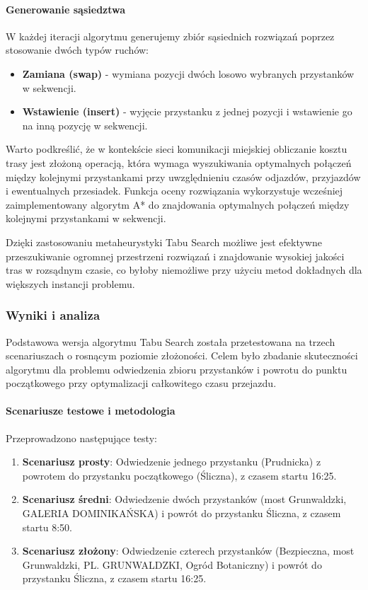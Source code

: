 \documentclass[12pt,a4paper]{article}
\begin{document}
\paragraph{Generowanie sąsiedztwa}
W każdej iteracji algorytmu generujemy zbiór sąsiednich rozwiązań poprzez stosowanie dwóch typów ruchów:
\begin{itemize}
    \item \textbf{Zamiana (swap)} - wymiana pozycji dwóch losowo wybranych przystanków w sekwencji.
    \item \textbf{Wstawienie (insert)} - wyjęcie przystanku z jednej pozycji i wstawienie go na inną pozycję w sekwencji.
\end{itemize}

Warto podkreślić, że w kontekście sieci komunikacji miejskiej obliczanie kosztu trasy jest złożoną operacją, która wymaga wyszukiwania optymalnych połączeń między kolejnymi przystankami przy uwzględnieniu czasów odjazdów, przyjazdów i ewentualnych przesiadek. Funkcja oceny rozwiązania wykorzystuje wcześniej zaimplementowany algorytm A* do znajdowania optymalnych połączeń między kolejnymi przystankami w sekwencji.

Dzięki zastosowaniu metaheurystyki Tabu Search możliwe jest efektywne przeszukiwanie ogromnej przestrzeni rozwiązań i znajdowanie wysokiej jakości tras w rozsądnym czasie, co byłoby niemożliwe przy użyciu metod dokładnych dla większych instancji problemu.

\subsubsection{Wyniki i analiza}
Podstawowa wersja algorytmu Tabu Search została przetestowana na trzech scenariuszach o rosnącym poziomie złożoności. Celem było zbadanie skuteczności algorytmu dla problemu odwiedzenia zbioru przystanków i powrotu do punktu początkowego przy optymalizacji całkowitego czasu przejazdu.

\paragraph{Scenariusze testowe i metodologia}
Przeprowadzono następujące testy:
\begin{enumerate}
    \item \textbf{Scenariusz prosty}: Odwiedzenie jednego przystanku (Prudnicka) z powrotem do przystanku początkowego (Śliczna), z czasem startu 16:25.
    \item \textbf{Scenariusz średni}: Odwiedzenie dwóch przystanków (most Grunwaldzki, GALERIA DOMINIKAŃSKA) i powrót do przystanku Śliczna, z czasem startu 8:50.
    \item \textbf{Scenariusz złożony}: Odwiedzenie czterech przystanków (Bezpieczna, most Grunwaldzki, PL. GRUNWALDZKI, Ogród Botaniczny) i powrót do przystanku Śliczna, z czasem startu 16:25.
\end{enumerate}
\end{document}

